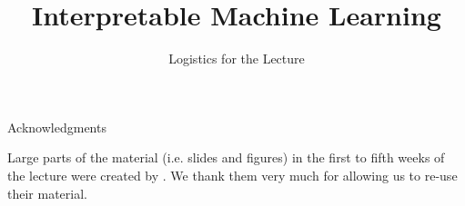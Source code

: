 \documentclass[aspectratio=169]{../latex_main/tntbeamer}  %
\title[Introduction]{Interpretable Machine Learning}
\subtitle{Logistics for the Lecture}
\begin{document}
	
	\maketitle

\begin{frame}[c]{Acknowledgments}

Large parts of the material (i.e. slides and figures) in the first to fifth weeks of the lecture were created by . We thank them very much for allowing us to re-use their material.


\end{frame}
\end{document}
